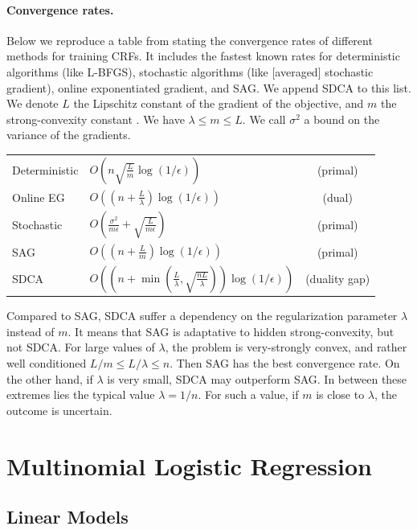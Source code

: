 \documentclass{article}
\DeclareMathOperator{\1}{\mathbb{1}}
\begin{document}
\paragraph{Convergence rates.}
Below we reproduce a table from \cite{schmidt_non-uniform_2015} stating the convergence rates of different methods for training CRFs.
It includes the fastest known rates for deterministic algorithms (like L-BFGS), stochastic algorithms (like [averaged] stochastic gradient), online exponentiated gradient, and SAG.
We append SDCA to this list.
We denote $L$ the Lipschitz constant of the gradient of the objective, and $m$ the strong-convexity constant .
We have $\lambda \leq m \leq L$.
We call $\sigma^2$ a bound on the variance of the gradients.\\
\begin{center}
\begin{tabular}{llc}
Deterministic & $O(n\sqrt{\frac{L}{m}}\log(1/\epsilon))$ & (primal)\\
Online EG & $O((n + \frac{L}{\lambda})\log(1/\epsilon))$ & (dual)\\
Stochastic & $O(\frac{\sigma^2}{m \epsilon}+\sqrt{\frac{L}{m \epsilon}})$ & (primal)\\
SAG & $O((n + \frac{L}{m})\log(1/\epsilon))$ & (primal) \\
SDCA & $O( (n + \min( \frac{L}{\lambda}, \sqrt{\frac{n L}{\lambda}}) ) \log(1/\epsilon) )$ & (duality gap)
\end{tabular}
\end{center}
Compared to SAG, SDCA suffer a dependency on the regularization parameter $\lambda$ instead of $m$.
It means that SAG is adaptative to  hidden strong-convexity, but not SDCA.
For large values of $\lambda$, the problem is very-strongly convex, and rather well  conditioned $L/m \leq L/\lambda \leq n$.
Then SAG has the best convergence rate.
On the other hand, if $\lambda$ is very small, SDCA may outperform SAG.
In between these extremes lies the typical value $\lambda=1/n$.
For such a value, if $m$ is close to $\lambda$, the outcome is uncertain.

\section{Multinomial Logistic Regression}

\subsection{Linear Models}
\end{document}
